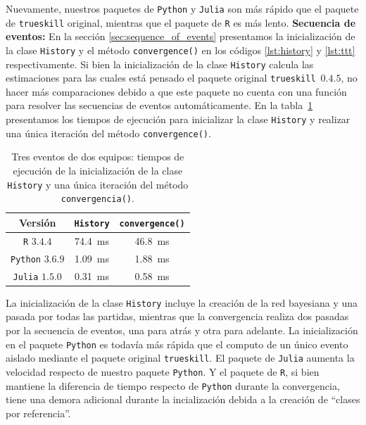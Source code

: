 \documentclass[a4paper,11pt]{book}
\theoremstyle{definition}
\begin{document}
%
Nuevamente, nuestros paquetes de \texttt{Python} y \texttt{Julia} son m\'as r\'apido que el paquete de \texttt{trueskill} original, mientras que el paquete de \texttt{R} es m\'as lento.
\textbf{Secuencia de eventos:}
%
En la secci\'on \ref{sec:sequence_of_events} presentamos la inicializaci\'on de la clase \texttt{History} y el m\'etodo \texttt{convergence()} en los c\'odigos \ref{lst:history} y \ref{lst:ttt} respectivamente.
%
Si bien la inicializaci\'on de la clase \texttt{History} calcula las estimaciones para las cuales est\'a pensado el paquete original \texttt{trueskill}~$0.4.5$, no hacer m\'as comparaciones debido a que este paquete no cuenta con una funci\'on para resolver las secuencias de eventos autom\'aticamente.
%
En la tabla~\ref{Tab:Sequence} presentamos los tiempos de ejecuci\'on para inicializar la clase \texttt{History} y realizar una \'unica iteraci\'on del m\'etodo \texttt{convergence()}.
%
\begin{table}[ht!] \centering
    \begin{tabular}{ccc}
        Versi\'on & \texttt{History} & \texttt{convergence()} \\ \hline
        \texttt{R} $3.4.4$        & \SI{74.4}{\ms}   & \SI{46.8}{\ms} \\
        \hline
        \texttt{Python} $3.6.9$   & \SI{1.09}{\ms}    & \SI{1.88}{\ms} \\
        \hline
        \texttt{Julia} $1.5.0$    &  \SI{0.31}{\ms}   & \SI{0.58}{\ms} \\
        \hline
    \end{tabular}
    \caption{
     Tres eventos de dos equipos: tiempos de ejecuci\'on de la inicializaci\'on de la clase \texttt{History} y una \'unica iteraci\'on del m\'etodo \texttt{convergencia()}.
    }
    \label{Tab:Sequence}
\end{table}
%
La inicializaci\'on de la clase \texttt{History} incluye la creaci\'on de la red bayesiana y una pasada por todas las partidas, mientras que la convergencia realiza dos pasadas por la secuencia de eventos, una para atr\'as y otra para adelante.
%
La inicializaci\'on en el paquete \texttt{Python} es todav\'ia m\'as r\'apida que el computo de un \'unico evento aislado mediante el paquete original \texttt{trueskill}.
%
El paquete de \texttt{Julia} aumenta la velocidad respecto de nuestro paquete \texttt{Python}.
%
Y el paquete de \texttt{R}, si bien mantiene la diferencia de tiempo respecto de \texttt{Python} durante la convergencia, tiene una demora adicional durante la incializaci\'on debida a la creaci\'on de ``clases por referencia''.
\end{document}
